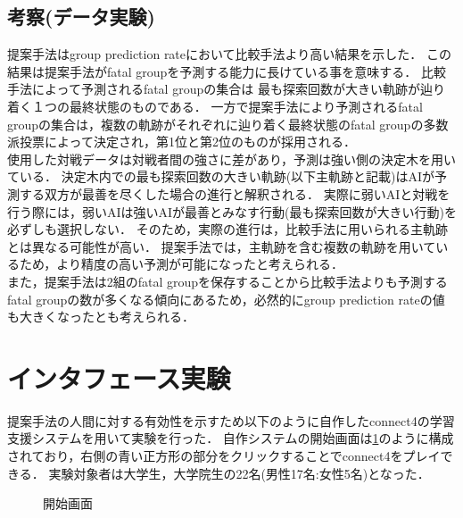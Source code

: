 \subsection{考察(データ実験)}
提案手法はgroup prediction rateにおいて比較手法より高い結果を示した．
この結果は提案手法がfatal groupを予測する能力に長けている事を意味する．
比較手法によって予測されるfatal groupの集合は
最も探索回数が大きい軌跡が辿り着く１つの最終状態のものである．
一方で提案手法により予測されるfatal groupの集合は，複数の軌跡がそれぞれに辿り着く最終状態のfatal groupの多数派投票によって決定され，第1位と第2位のものが採用される．\\
使用した対戦データは対戦者間の強さに差があり，予測は強い側の決定木を用いている．
決定木内での最も探索回数の大きい軌跡(以下主軌跡と記載)はAIが予測する双方が最善を尽くした場合の進行と解釈される．
実際に弱いAIと対戦を行う際には，弱いAIは強いAIが最善とみなす行動(最も探索回数が大きい行動)を必ずしも選択しない．
そのため，実際の進行は，比較手法に用いられる主軌跡とは異なる可能性が高い．
提案手法では，主軌跡を含む複数の軌跡を用いているため，より精度の高い予測が可能になったと考えられる．\\
また，提案手法は2組のfatal groupを保存することから比較手法よりも予測するfatal groupの数が多くなる傾向にあるため，必然的にgroup prediction rateの値も大きくなったとも考えられる．


\section{インタフェース実験}
提案手法の人間に対する有効性を示すため以下のように自作したconnect4の学習支援システムを用いて実験を行った．
自作システムの開始画面は\ref{fig:basic}のように構成されており，右側の青い正方形の部分をクリックすることでconnect4をプレイできる．
実験対象者は大学生，大学院生の22名(男性17名:女性5名)となった．
\begin{figure}[htbp]
    \centering
    \setlength{\fboxsep}{1pt} %
    \setlength{\fboxrule}{1pt} %
    \caption{開始画面}
    \label{fig:basic}
\end{figure}

